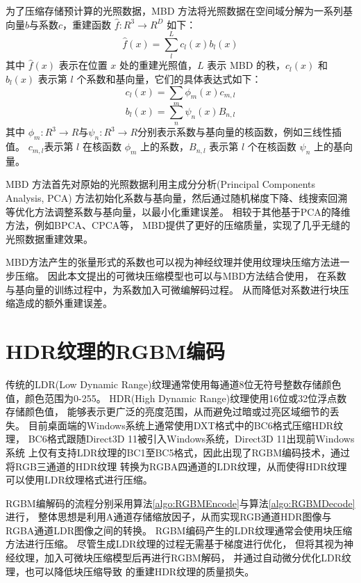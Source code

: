 为了压缩存储预计算的光照数据，MBD 方法将光照数据在空间域分解为一系列基向量$b$与系数$c$，重建函数 $\hat{f}:R^3\to R^D$ 如下：
\begin{equation}
\hat f(x)=\sum_{l}^L c_{l} (x)b_{l}(x)
\end{equation}
其中 $\hat{f}(x)$ 表示在位置 $x$ 处的重建光照值，$L$ 表示 MBD 的秩，$c_l(x)$ 和 $b_l(x)$ 表示第 $l$ 个系数和基向量，它们的具体表达式如下：
\begin{equation}
c_{l}(x)=\sum_{m}\phi_{m} (x)c_{m,l}
\end{equation}
\begin{equation}
b_{l}(x)=\sum_{n}\psi_{n} (x)B_{n,l}
\end{equation}
其中 $\phi_{m}: R^{3} \rightarrow R$与$\psi_{n}: R^{3} \rightarrow R$分别表示系数与基向量的核函数，例如三线性插值。 
$c_{m,l}$表示第 $l$ 在核函数 $\phi_m$ 上的系数，$B_{n,l}$ 表示第 $l$ 个在核函数 $\psi_n$ 上的基向量。

MBD\cite{silvennoinen2021moving} 方法首先对原始的光照数据利用主成分分析(Principal Components Analysis, PCA)
方法初始化系数与基向量，然后通过随机梯度下降、线搜索回溯等优化方法调整系数与基向量，以最小化重建误差。
相较于其他基于PCA的降维方法，例如BPCA\cite{nishino2005clustered}、CPCA\cite{sloan2003clustered}等，
MBD提供了更好的压缩质量，实现了几乎无缝的光照数据重建效果。

MBD方法产生的张量形式的系数也可以视为神经纹理并使用纹理块压缩方法进一步压缩。
因此本文提出的可微块压缩模型也可以与MBD方法结合使用，
在系数与基向量的训练过程中，为系数加入可微编解码过程。
从而降低对系数进行块压缩造成的额外重建误差。

\section{HDR纹理的RGBM编码}

传统的LDR(Low Dynamic Range)纹理通常使用每通道8位无符号整数存储颜色值，颜色范围为0-255。
HDR(High Dynamic Range)纹理使用16位或32位浮点数存储颜色值，
能够表示更广泛的亮度范围，从而避免过暗或过亮区域细节的丢失。
目前桌面端的Windows系统上通常使用DXT格式中的BC6格式压缩HDR纹理，
BC6格式跟随Direct3D 11被引入Windows系统，Direct3D 11出现前Windows系统
上仅有支持LDR纹理的BC1至BC5格式，因此出现了RGBM编码技术，通过将RGB三通道的HDR纹理
转换为RGBA四通道的LDR纹理，从而使得HDR纹理可以使用LDR纹理格式进行压缩。

RGBM编解码的流程分别采用算法\ref{algo:RGBMEncode}与算法\ref{algo:RGBMDecode}进行，
整体思想是利用A通道存储缩放因子，从而实现RGB通道HDR图像与RGBA通道LDR图像之间的转换。
RGBM编码产生的LDR纹理通常会使用块压缩方法进行压缩。
尽管生成LDR纹理的过程无需基于梯度进行优化，
但将其视为神经纹理，加入可微块压缩模型后再进行RGBM解码，
并通过自动微分优化LDR纹理，也可以降低块压缩导致
的重建HDR纹理的质量损失。


